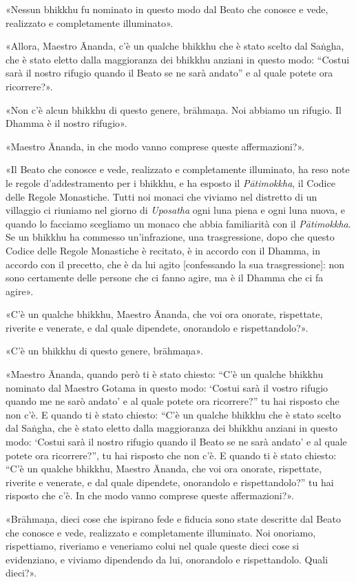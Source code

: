 «Nessun bhikkhu fu nominato in questo modo dal Beato che conosce e vede,
realizzato e completamente illuminato».


«Allora, Maestro Ānanda, c’è un qualche bhikkhu che è stato scelto dal
Saṅgha, che è stato eletto dalla maggioranza dei bhikkhu anziani in
questo modo: “Costui sarà il nostro rifugio quando il Beato se ne sarà
andato” e al quale potete ora ricorrere?».


«Non c’è alcun bhikkhu di questo genere, brāhmaṇa. Noi abbiamo un
rifugio. Il Dhamma è il nostro rifugio».


«Maestro Ānanda, in che modo vanno comprese queste affermazioni?».


«Il Beato che conosce e vede, realizzato e completamente illuminato, ha
reso note le regole d’addestramento per i bhikkhu, e ha esposto il
\emph{Pātimokkha}, il Codice delle Regole Monastiche. Tutti noi monaci che
viviamo nel distretto di un villaggio ci riuniamo nel giorno di
\emph{Uposatha} ogni luna piena e ogni luna nuova, e quando lo facciamo
scegliamo un monaco che abbia familiarità con il \emph{Pātimokkha}. Se un
bhikkhu ha commesso un’infrazione, una trasgressione, dopo che questo
Codice delle Regole Monastiche è recitato, è in accordo con il Dhamma,
in accordo con il precetto, che è da lui agito [confessando la sua
trasgressione]: non sono certamente delle persone che ci fanno agire, ma
è il Dhamma che ci fa agire».


«C’è un qualche bhikkhu, Maestro Ānanda, che voi ora onorate,
rispettate, riverite e venerate, e dal quale dipendete, onorandolo e
rispettandolo?».


«C’è un bhikkhu di questo genere, brāhmaṇa».


«Maestro Ānanda, quando però ti è stato chiesto: “C’è un qualche bhikkhu
nominato dal Maestro Gotama in questo modo: ‘Costui sarà il vostro
rifugio quando me ne sarò andato’ e al quale potete ora ricorrere?” tu
hai risposto che non c’è. E quando ti è stato chiesto: “C’è un qualche
bhikkhu che è stato scelto dal Saṅgha, che è stato eletto dalla
maggioranza dei bhikkhu anziani in questo modo: ‘Costui sarà il nostro
rifugio quando il Beato se ne sarà andato’ e al quale potete ora
ricorrere?”, tu hai risposto che non c’è. E quando ti è stato chiesto:
“C’è un qualche bhikkhu, Maestro Ānanda, che voi ora onorate,
rispettate, riverite e venerate, e dal quale dipendete, onorandolo e
rispettandolo?” tu hai risposto che c’è. In che modo vanno comprese
queste affermazioni?».


«Brāhmaṇa, dieci cose che ispirano fede e fiducia sono state descritte
dal Beato che conosce e vede, realizzato e completamente illuminato. Noi
onoriamo, rispettiamo, riveriamo e veneriamo colui nel quale queste
dieci cose si evidenziano, e viviamo dipendendo da lui, onorandolo e
rispettandolo. Quali dieci?».


